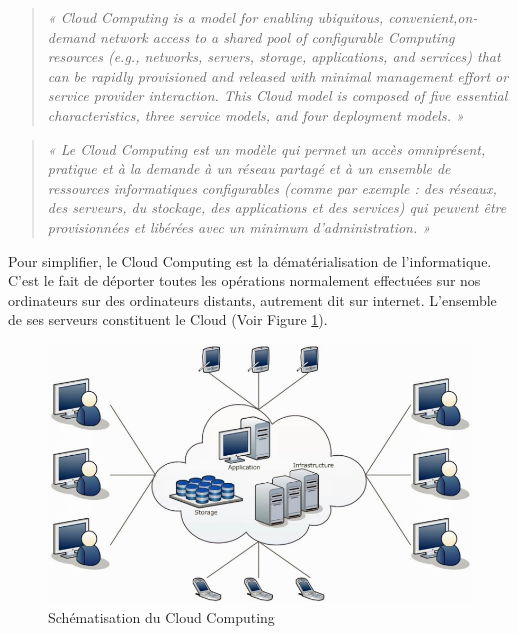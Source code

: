   \begin{quotation}
    \emph{« Cloud Computing is a model for enabling ubiquitous, convenient,on-demand network access to a shared pool of configurable Computing resources (e.g., networks, servers, storage, applications, and services) that can be rapidly provisioned and released with minimal management effort or service provider interaction. This Cloud model is composed of five essential characteristics, three service models, and four deployment models. »}
  \end{quotation}

  \begin{quotation}
    \emph{« Le Cloud Computing est un modèle qui permet un accès omniprésent, pratique et à la demande à un réseau partagé et à un ensemble de ressources informatiques configurables (comme par exemple : des réseaux, des serveurs, du stockage, des applications et des services) qui peuvent être provisionnées et libérées avec un minimum d’administration. »}\\
  \end{quotation}

  Pour simplifier, le Cloud Computing est la dématérialisation de l’informatique. C’est le fait de déporter toutes les opérations normalement effectuées sur nos ordinateurs sur des ordinateurs distants, autrement dit sur internet. L’ensemble de ses serveurs constituent le Cloud (Voir Figure \ref{Cloud Computing}).

  \begin{figure}
    \begin{center}
      \includegraphics[scale=0.3]{images/CloudComputing.png}
    \end{center}
    \caption{Schématisation du Cloud Computing}
    \label{Cloud Computing}
  \end{figure}

